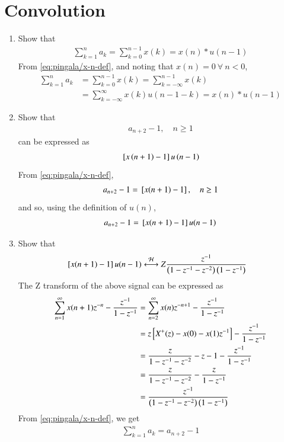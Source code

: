 \documentclass[journal,12pt,twocolumn]{IEEEtran}
\renewcommand\thesection{\arabic{section}}
\begin{document}
\section{Convolution}
\begin{enumerate}[label=\thesection.\arabic*,ref=\thesection.\theenumi]
\item Show that 
\begin{align}
	\sum_{k=1}^{n}a_k = 
	\sum_{k=0}^{n-1}x(k) = x(n)*u(n-1)
\end{align}
\solution From \eqref{eq:pingala/x-n-def}, and noting that $x(n) = 0\ \forall\ n < 0$,
\begin{align}
    \sum_{k=1}^{n}a_k &= \sum_{k=0}^{n-1}x(k) 
                      = \sum_{k = -\infty}^{n - 1}x(k) \\
                      &= \sum_{k = -\infty}^{\infty}x(k)u(n - 1 - k) 
                      = x(n)*u(n - 1)
\end{align}
\item Show that 
\begin{align}
a_{n+2}-1, \quad n \ge 1
\end{align}
can be expressed as 
\begin{align}
	{}\left[x\left(n+1\right)-1\right]u\left(n-1\right)
\end{align}
\solution From \eqref{eq:pingala/x-n-def},
\begin{align}
    a_{n+2} - 1 = {}\left[x(n + 1) - 1\right], \quad n \ge 1
\end{align}
and so, using the definition of $u(n)$,
\begin{align}
    a_{n+2} - 1 = {}\left[x(n + 1) - 1\right]u(n-1)
\end{align}
\item Show that
\begin{align}
	{}\left[x(n + 1) - 1\right]u(n-1)&\overset{\mathcal{H}}{ \longleftrightarrow}{Z} 
     \frac{z^{-1}}{\left(1 - z^{-1} - z^{-2}\right)\left(1 - z^{-1}\right)} 
\end{align}
\solution The Z transform of the above signal can be expressed as
\begin{align}
	\sum_{n = 1}^{\infty}x(n + 1) z^{-n} -\frac{z^{-1}}{1-z^{-1}}
	&=\sum_{n = 2}^{\infty}x(n) z^{-n+1} -\frac{z^{-1}}{1-z^{-1}}
	\\
	&=z{}\left[X^{+}(z) - x(0) -x(1)z^{-1}\right] -\frac{z^{-1}}{1-z^{-1}}
	\\
	&= \frac{z}{1 - z^{-1} - z^{-2}} - z - 1 - \frac{z^{-1}}{1 - z^{-1}} \\
	&= \frac{z}{1 - z^{-1} - z^{-2}} -  \frac{z}{1 - z^{-1}} \\
	&=\frac{z^{-1}}{\left(1 - z^{-1} - z^{-2}\right)\left(1 - z^{-1}\right)} 
\end{align}
From \eqref{eq:pingala/x-n-def}, we get
\begin{align}
    \sum_{k = 1}^{n}a_k = a_{n+2} - 1
\end{align}
\end{enumerate}
\end{document}
